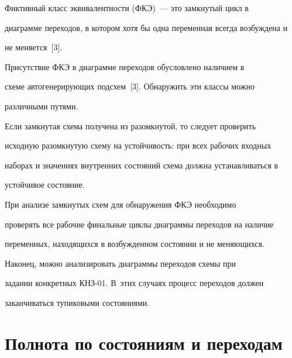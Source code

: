       


      Фиктивный класс эквивалентности (ФКЭ)~--- это замкнутый цикл в 


диаграмме переходов, в котором хотя бы одна переменная всегда возбуждена и 


не меняется~[3].


      


      Присутствие ФКЭ в диаграмме переходов обусловлено наличием в 


схеме автогенерирующих подсхем~[3]. Обнаружить эти классы можно 


различными путями.


      


      Если замкнутая схема получена из разомкнутой, то следует проверить 


исходную разомкнутую схему на устойчивость: при всех рабочих входных 


наборах и значениях внутренних состояний схема должна устанавливаться в 


устойчивое состояние.


      


      При анализе замкнутых схем для обнаружения ФКЭ необходимо 


проверять все рабочие финальные циклы диаграммы переходов на наличие 


переменных, находящихся в возбужденном состоянии и не меняющихся.


      


      Наконец, можно анализировать диаграммы переходов схемы при 


задании конкретных КНЗ-01. В~этих случаях процесс переходов должен 


заканчиваться тупиковыми состояниями.







      


      \section{Полнота по состояниям и переходам}


      


